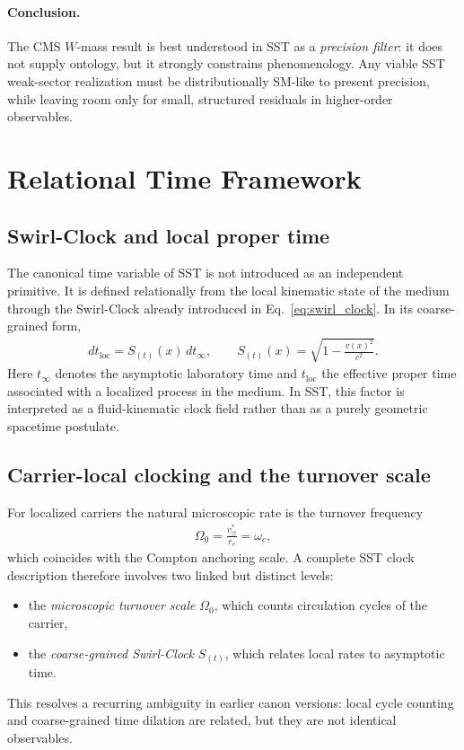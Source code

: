 \documentclass[11pt]{article}
\theoremstyle{definition}
\theoremstyle{plain}
\theoremstyle{remark}
\newcommand{\rc}{{r_c}}
\newcommand{\vchar}{v_{\!\boldsymbol{\circlearrowleft}}^{\ast}}
\begin{document}
        \paragraph{Conclusion.}
            The CMS $W$-mass result is best understood in SST as a \emph{precision filter}:
            it does not supply ontology, but it strongly constrains phenomenology. Any viable SST weak-sector realization must be distributionally SM-like to present precision, while leaving room only for small, structured residuals in higher-order observables.

    \section{Relational Time Framework}
        \label{sec:time}

    \subsection{Swirl-Clock and local proper time}
        The canonical time variable of SST is not introduced as an independent primitive. It is defined relationally from the local kinematic state of the medium through the Swirl-Clock already introduced in Eq.~\eqref{eq:swirl_clock}. In its coarse-grained form,
        \begin{align}
            dt_{\mathrm{loc}} = S_{(t)}(x)\,dt_{\infty},
            \qquad
            S_{(t)}(x)=\sqrt{1-\frac{v(x)^2}{c^2}}.
        \end{align}
        Here $t_{\infty}$ denotes the asymptotic laboratory time and $t_{\mathrm{loc}}$ the effective proper time associated with a localized process in the medium. In SST, this factor is interpreted as a fluid-kinematic clock field rather than as a purely geometric spacetime postulate.

    \subsection{Carrier-local clocking and the turnover scale}
        For localized carriers the natural microscopic rate is the turnover frequency
        \begin{align}
            \Omega_0 = \frac{\vchar}{\rc} = \omega_c,
        \end{align}
        which coincides with the Compton anchoring scale. A complete SST clock description therefore involves two linked but distinct levels:
        \begin{itemize}
            \item the \emph{microscopic turnover scale} $\Omega_0$, which counts circulation cycles of the carrier,
            \item the \emph{coarse-grained Swirl-Clock} $S_{(t)}$, which relates local rates to asymptotic time.
        \end{itemize}
        This resolves a recurring ambiguity in earlier canon versions: local cycle counting and coarse-grained time dilation are related, but they are not identical observables.
\end{document}
